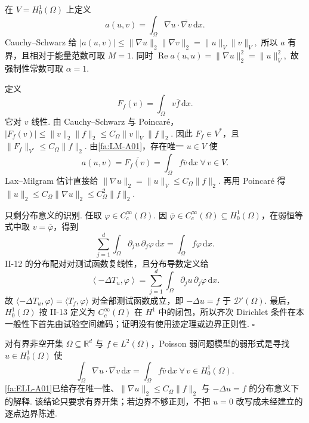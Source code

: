 \begin{FAProof}
在 \(\displaystyle V=H_0^1(\Omega)\) 上定义
\[
a(u,v)
=
\int_\Omega
\nabla u\mathbin{\cdot}\overline{\nabla v}
\,\mathrm{d}x.
\]
Cauchy--Schwarz 给 \(\displaystyle |a(u,v)| \leqslant \|\nabla u\|_2\|\nabla v\|_2 = \|u\|_V\|v\|_V,\)
所以 \(\displaystyle a\) 有界，且相对于能量范数可取 \(\displaystyle M=1\). 同时 \(\displaystyle \operatorname{Re}a(u,u) = \|\nabla u\|_2^2 = \|u\|_V^2,\)
故强制性常数可取 \(\displaystyle\alpha=1\).

定义
\[
F_f(v)
=
\int_\Omega
v\overline f
\,\mathrm{d}x.
\]
它对 \(\displaystyle v\) 线性. 由 Cauchy--Schwarz 与 Poincaré， \(\displaystyle |F_f(v)| \leqslant \|v\|_2\|f\|_2 \leqslant C_\Omega\|v\|_V\|f\|_2.\)
因此 \(\displaystyle F_f\in V^*\)，且 \(\displaystyle\|F_f\|_{V^*}\leqslant C_\Omega\|f\|_2\). 由\autoref{fa:LM-A01}，存在唯一 \(\displaystyle u\in V\) 使
\[
a(u,v)
=
\overline{F_f(v)}
=
\int_\Omega
f\overline v
\,\mathrm{d}x
\;
\forall\,v\in V.
\]
Lax--Milgram 估计直接给 \(\displaystyle \|\nabla u\|_2 = \|u\|_V \leqslant C_\Omega\|f\|_2.\)
再用 Poincaré 得 \(\displaystyle\|u\|_2\leqslant C_\Omega\|\nabla u\|_2\leqslant C_\Omega^2\|f\|_2\).

只剩分布意义的识别. 任取 \(\displaystyle\varphi\in C_c^\infty(\Omega)\). 因 \(\displaystyle\overline\varphi\in C_c^\infty(\Omega)\subseteq H_0^1(\Omega)\)，在弱恒等式中取 \(\displaystyle v=\overline\varphi\)，得到
\[
\sum_{j=1}^d
\int_\Omega
\partial_ju\,\partial_j\varphi
\,\mathrm{d}x
=
\int_\Omega
f\varphi
\,\mathrm{d}x.
\]
II-12 的分布配对对测试函数复线性，且分布导数定义给
\[
\left\langle-\Delta T_u,\varphi\right\rangle
=
\sum_{j=1}^d
\int_\Omega
\partial_ju\,\partial_j\varphi
\,\mathrm{d}x.
\]
故 \(\displaystyle\langle-\Delta T_u,\varphi\rangle=\langle T_f,\varphi\rangle\) 对全部测试函数成立，即 \(\displaystyle-\Delta u=f\) 于 \(\displaystyle\mathcal D'(\Omega)\). 最后，\(\displaystyle H_0^1(\Omega)\) 按 II-13 定义为 \(\displaystyle C_c^\infty(\Omega)\) 在 \(\displaystyle H^1\) 中的闭包，所以齐次 Dirichlet 条件在本一般性下首先由试验空间编码；证明没有使用迹定理或边界正则性.
\hfill\(\square\)
\end{FAProof}

\begin{FAExample}\label{ii15:ex-poisson}
对有界非空开集 \(\displaystyle\Omega\subseteq\mathbb R^d\) 与 \(\displaystyle f\in L^2(\Omega)\)，Poisson 弱问题模型的弱形式是寻找 \(\displaystyle u\in H_0^1(\Omega)\) 使
\[
\int_\Omega
\nabla u\mathbin{\cdot}\overline{\nabla v}
\,\mathrm{d}x
=
\int_\Omega
f\overline v
\,\mathrm{d}x
\;
\forall\,v\in H_0^1(\Omega).
\]
\autoref{fa:ELL-A01}已给存在唯一性、\(\displaystyle\|\nabla u\|_2\leqslant C_\Omega\|f\|_2\) 与 \(\displaystyle-\Delta u=f\) 的分布意义下的解释. 该结论只要求有界开集；若边界不够正则，不把 \(\displaystyle u=0\) 改写成未经建立的逐点边界陈述.
\end{FAExample}

